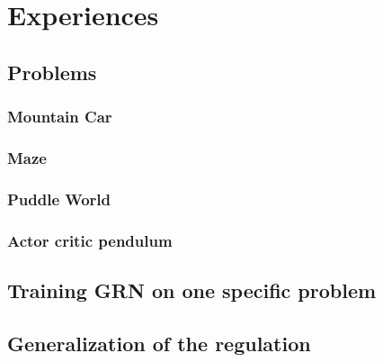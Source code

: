 \section{Experiences}
\subsection{Problems}
\subsubsection{Mountain Car}
\subsubsection{Maze}
\subsubsection{Puddle World}
\subsubsection{Actor critic pendulum}

\subsection{Training GRN on one specific problem}

\subsection{Generalization of the regulation}